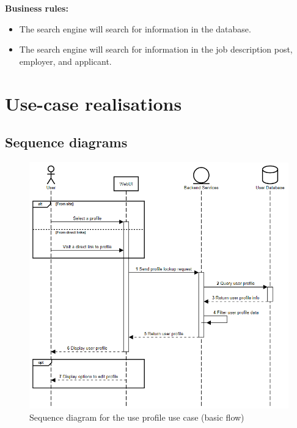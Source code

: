\documentclass[a4paper]{article}
\begin{document}
        \textbf{Business rules:}
        \begin{itemize}
            \item The search engine will search for information in the database.
            \item The search engine will search for information in the job description post, employer, and applicant.
        \end{itemize}
\section{Use-case realisations}
    \subsection{Sequence diagrams}

    \begin{figure}[H]
        \centering
        \includegraphics[width=1.0\textwidth]{view_profile.png}
        \caption{Sequence diagram for the use profile use case (basic flow)}
        \label{fig:fig2}
    \end{figure}
\end{document}
